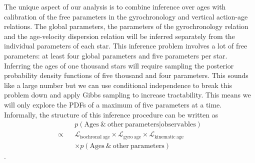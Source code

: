 \documentclass[12pt]{article}
\newcommand{\ie}{{\it i.e.}}
\newcommand{\feh}{$[Fe/H]$}
\newcommand{\teff}{$T_{\mathrm{eff}}$}
\begin{document}
The unique aspect of our analysis is to combine inference over ages with
calibration of the free parameters in the gyrochronology and vertical
action-age relations.
The global parameters, the parameters of the gyrochronology relation and the
age-velocity dispersion relation will be inferred separately from the
individual parameters of each star.
This inference problem involves a lot of free parameters: at least four global
parameters and five parameters per star.
Inferring the ages of one thousand stars will require sampling the posterior
probability density functions of five thousand and four parameters.
This sounds like a large number but we can use conditional independence to
break this problem down and apply Gibbs sampling to increase tractability.
This means we will only explore the PDFs of a maximum of five parameters at a
time.
Informally, the structure of this inference procedure can be written as
\begin{eqnarray}
    &&p(\mathrm{Ages~\&~other~parameters}|\mathrm{observables}) \\
    \propto &&\mathcal{L}_{\mathrm{isochronal~age}} \times
    \mathcal{L}_{\mathrm{gyro~age}} \times
    \mathcal{L}_{\mathrm{kinematic~age}} \\
    && \times p(\mathrm{Ages~\&~other~parameters})
\end{eqnarray}.
\end{document}
